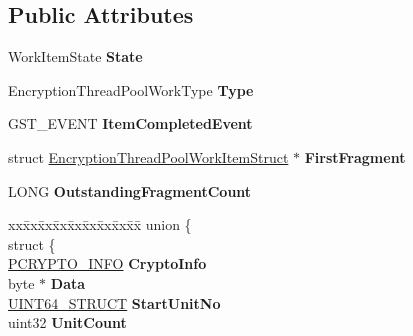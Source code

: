 \subsection*{Public Attributes}
\begin{DoxyCompactItemize}
\item 
\mbox{\label{struct_encryption_thread_pool_work_item_struct_ab658e05b69101bee9eb292f291a50e8e}} 
Work\+Item\+State {\bfseries State}
\item 
\mbox{\label{struct_encryption_thread_pool_work_item_struct_af0876fc99daf65dec1278773b2dad512}} 
Encryption\+Thread\+Pool\+Work\+Type {\bfseries Type}
\item 
\mbox{\label{struct_encryption_thread_pool_work_item_struct_a76d7e265840e6bc39c63fd2f8156bcbc}} 
G\+S\+T\+\_\+\+E\+V\+E\+NT {\bfseries Item\+Completed\+Event}
\item 
\mbox{\label{struct_encryption_thread_pool_work_item_struct_a5073002ab5ef0c01751e7f5609f78996}} 
struct \hyperlink{struct_encryption_thread_pool_work_item_struct}{Encryption\+Thread\+Pool\+Work\+Item\+Struct} $\ast$ {\bfseries First\+Fragment}
\item 
\mbox{\label{struct_encryption_thread_pool_work_item_struct_afcb13ad71790491596fdca34452fccf8}} 
L\+O\+NG {\bfseries Outstanding\+Fragment\+Count}
\item 
\mbox{\label{struct_encryption_thread_pool_work_item_struct_ac3adc704b164be032ff72c5680a0bca6}} 
\begin{tabbing}
xx\=xx\=xx\=xx\=xx\=xx\=xx\=xx\=xx\=\kill
union \{\\
\>struct \{\\
\>\>\hyperlink{struct_c_r_y_p_t_o___i_n_f_o__t}{PCRYPTO\_INFO} {\bfseries CryptoInfo}\\
\>\>byte $\ast$ {\bfseries Data}\\
\>\>\hyperlink{union_u_i_n_t64___s_t_r_u_c_t}{UINT64\_STRUCT} {\bfseries StartUnitNo}\\
\>\>uint32 {\bfseries UnitCount}\\

\end{tabbing}
\end{DoxyCompactItemize}
